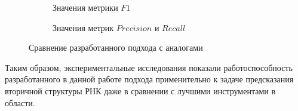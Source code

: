 \begin{figure}[h]
\centering
\begin{subfigure}{.5\textwidth}
  \centering
  \caption{Значения метрики $F1$}
  \label{plot_f1}
\end{subfigure}%
\begin{subfigure}{.5\textwidth}
  \centering
  \caption{Значения метрик $Precision$ и $Recall$}
  \label{plot_pr}
\end{subfigure}
\caption{Сравнение разработанного подхода с аналогами}
\label{plot}
\end{figure}

Таким образом, экспериментальные исследования показали работоспособность разработанного в данной работе подхода применительно к задаче предсказания вторичной структуры РНК даже в сравнении с лучшими инструментами в области.